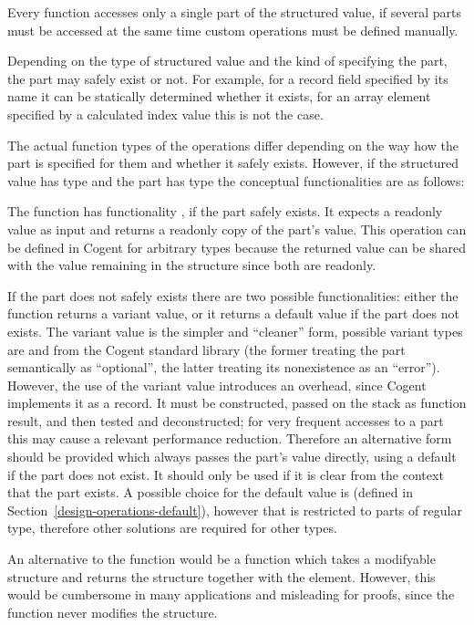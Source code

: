Every function accesses only a single part of the structured value, if several parts must be accessed at the same
time custom operations must be defined manually.

Depending on the type of structured value and the kind of specifying the part, the part may safely exist or not.
For example, for a record field specified by its name it can be statically determined whether it exists,
for an array element specified by a calculated index value this is not the case. 

The actual function types of the operations differ depending on the way how the part is specified for them and
whether it safely exists. However, if the structured value has type  and the part has type  
the conceptual functionalities are as follows:

The function  has functionality , if the part safely exists. It expects a readonly value as input and returns
a readonly copy of the part's value. This operation can be defined in Cogent for arbitrary types 
because the returned value can be shared with the value remaining in the structure since both are readonly.

If the part does not safely exists there are two possible functionalities: either the function returns a variant
value, or it returns a default value if the part does not exists. The variant value is the simpler and ``cleaner''
form, possible variant types are  and  from the Cogent standard library (the former treating
the part semantically as ``optional'', the latter treating its nonexistence as an ``error''). However, the use
of the variant value introduces an overhead, since Cogent implements it as a record. It must be constructed, passed
on the stack as function result, and then tested and deconstructed; for very frequent accesses to a part this may
cause a relevant performance reduction. Therefore an alternative form should be provided which always passes the
part's value directly, using a default if the part does not exist. It should only be used if it is clear from the
context that the part exists. A possible choice for the default value is  (defined in 
Section~\ref{design-operations-default}), however that is restricted to parts of regular type, therefore other 
solutions are required for other types.

An alternative to the function  would be a function which takes a modifyable structure and returns the structure
together with the element. However, this would be cumbersome in many applications and misleading for proofs, since 
the function never modifies the structure. 


